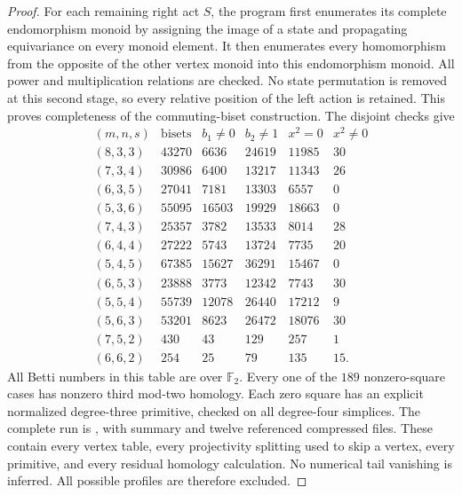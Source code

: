 \begin{proof}
For each remaining right act $S$, the program first enumerates
its complete endomorphism monoid by assigning the image of a
state and propagating equivariance on every monoid element.
It then enumerates every homomorphism from the opposite of the
other vertex monoid into this endomorphism monoid.  All power
and multiplication relations are checked.  No state permutation
is removed at this second stage, so every relative position of
the left action is retained.  This proves completeness of the
commuting-biset construction.  The disjoint checks give
\[
\begin{array}{c|r|r|r|r|r}
(m,n,s)&\text{bisets}&b_1\ne0&b_2\ne1&x^2=0&x^2\ne0\\\hline
(8,3,3)&43270&6636&24619&11985&30\\
(7,3,4)&30986&6400&13217&11343&26\\
(6,3,5)&27041&7181&13303&6557&0\\
(5,3,6)&55095&16503&19929&18663&0\\
(7,4,3)&25357&3782&13533&8014&28\\
(6,4,4)&27222&5743&13724&7735&20\\
(5,4,5)&67385&15627&36291&15467&0\\
(6,5,3)&23888&3773&12342&7743&30\\
(5,5,4)&55739&12078&26440&17212&9\\
(5,6,3)&53201&8623&26472&18076&30\\
(7,5,2)&430&43&129&257&1\\
(6,6,2)&254&25&79&135&15.
\end{array}
\]
All Betti numbers in this table are over $\mathbb F_2$.
Every one of the $189$ nonzero-square cases has nonzero third
mod-two homology.  Each zero square has an explicit normalized
degree-three primitive, checked on all degree-four simplices.
The complete run is , with
summary  and
twelve referenced compressed files.  These contain every vertex
table, every projectivity splitting used to skip a vertex, every
primitive, and every residual homology calculation.  No numerical
tail vanishing is inferred.  All possible profiles are therefore
excluded.
\end{proof}


